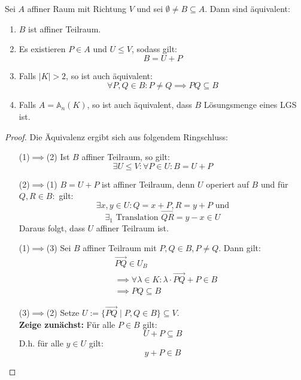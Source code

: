 \documentclass[parskip,a4paper,twoside,DIV15,BCOR12mm]{scrbook}
\begin{document}
\begin{theo}[Teilraumkriterium]
\label{Satz 20.1}
Sei $A$ affiner Raum mit Richtung $V$ und sei $\emptyset \ne B\subseteq A$. Dann 
sind äquivalent:
\begin{enumerate}
\item $B$ ist affiner Teilraum.
\item Es existieren $P\in A$ und $U\le V$, sodass gilt:
\[B=U+P\]
\item Falls $|K| >2$, so ist auch äquivalent:
\[\forall P,Q\in B: P\ne Q \implies PQ \subseteq B\]
\item Falls $A=\mathbb{A}_n(K)$, so ist auch äquivalent, dass $B$ Lösungsmenge eines LGS ist.
\end{enumerate}
\end{theo}

\begin{proof}
Die Äquivalenz ergibt sich aus folgendem Ringschluss:
\begin{itemize}
\item[(1)$\implies$(2)] Ist $B$ affiner Teilraum, so gilt:
\[\exists U\le V:\forall P\in U:B=U+P\]
\item[(2)$\implies$(1)] $B=U+P$ ist affiner Teilraum, denn $U$ operiert auf $B$
und für $Q,R\in B:$ gilt:
\[\exists x,y\in U: Q=x+P,R=y+P \text{ und}\] 
\[\exists_1 \text{ Translation } \overrightarrow{QR}=y-x\in U\]
Daraus folgt, dass $U$ affiner Teilraum ist.
\item[(1)$\implies$(3)] Sei $B$ affiner Teilraum mit $P,Q\in B, P\ne Q$. Dann gilt:
\begin{align*}
&\overrightarrow{PQ}\in U_B\\
&\implies\forall \lambda\in K:\lambda\cdot\overrightarrow{PQ}+P\in B\\
&\implies PQ\subseteq B
\end{align*}
\item[(3)$\implies$(2)] Setze $U:=\{\overrightarrow{PQ}\mid P,Q\in B\}\subseteq V$.\\
\textbf{Zeige zunächst:} Für alle $P\in B$ gilt:
\[U+P\subseteq B\] 
D.h. für alle $y\in U$ gilt:
\[y+P\in B\]
\end{itemize}
\end{proof}
\end{document}
